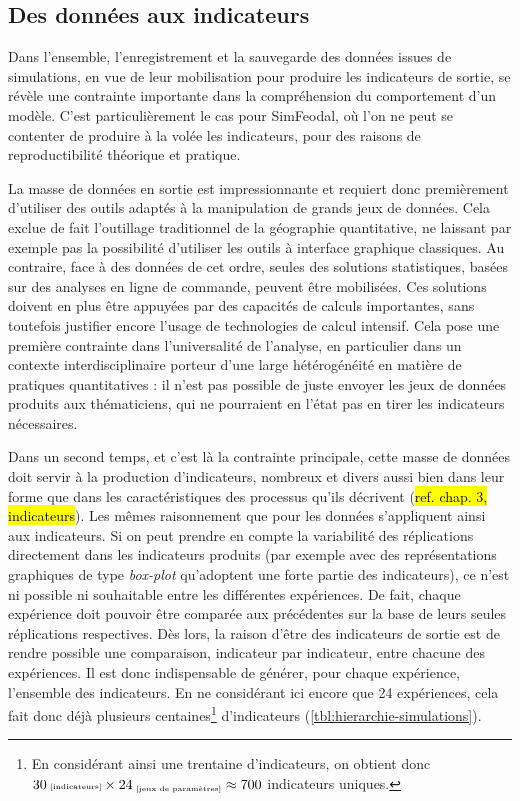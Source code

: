 	\subsection{Des données aux indicateurs}\label{subsec:donnees-indicateurs}
	Dans l'ensemble, l'enregistrement et la sauvegarde des données issues de simulations, en vue de leur mobilisation pour produire les indicateurs de sortie, se révèle une contrainte importante dans la compréhension du comportement d'un modèle.
	C'est particulièrement le cas pour SimFeodal, où l'on ne peut se contenter de produire à la volée les indicateurs, pour des raisons de reproductibilité théorique et pratique.
	
	La masse de données en sortie est impressionnante et requiert donc premièrement d'utiliser des outils adaptés à la manipulation de grands jeux de données.
	Cela exclue de fait l'outillage traditionnel de la géographie quantitative, ne laissant par exemple pas la possibilité d'utiliser les outils à interface graphique classiques.
	Au contraire, face à des données de cet ordre, seules des solutions statistiques, basées sur des analyses en ligne de commande, peuvent être mobilisées.
	Ces solutions doivent en plus être appuyées par des capacités de calculs importantes, sans toutefois justifier encore l'usage de technologies de calcul intensif.
	Cela pose une première contrainte dans l'universalité de l'analyse, en particulier dans un contexte interdisciplinaire porteur d'une large hétérogénéité en matière de pratiques quantitatives : il n'est pas possible de juste envoyer les jeux de données produits aux thématiciens, qui ne pourraient en l'état pas en tirer les indicateurs nécessaires.

	Dans un second temps, et c'est là la contrainte principale, cette masse de données doit servir à la production d'indicateurs, nombreux et divers aussi bien dans leur forme que dans les caractéristiques des processus qu'ils décrivent (\hl{ref. chap. 3, indicateurs}).
	Les mêmes raisonnement que pour les données s'appliquent ainsi aux indicateurs.
	Si on peut prendre en compte la variabilité des réplications directement dans les indicateurs produits (par exemple avec des représentations graphiques de type \textit{box-plot} qu'adoptent une forte partie des indicateurs), ce n'est ni possible ni souhaitable entre les différentes expériences.
	De fait, chaque expérience doit pouvoir être comparée aux précédentes sur la base de leurs seules réplications respectives.
	Dès lors, la raison d'être des indicateurs de sortie est de rendre possible une comparaison, indicateur par indicateur, entre chacune des expériences. 
	Il est donc indispensable de générer, pour chaque expérience, l'ensemble des indicateurs. En ne considérant ici encore que 24 expériences, cela fait donc déjà plusieurs centaines\footnote{
	En considérant ainsi une trentaine d'indicateurs, on obtient donc $30{\text{\tiny ~[indicateurs]}} \times 24_{\text{\tiny ~[jeux de paramètres]}} \approx 700$ indicateurs uniques.
	} d'indicateurs (\cref{tbl:hierarchie-simulations}).

